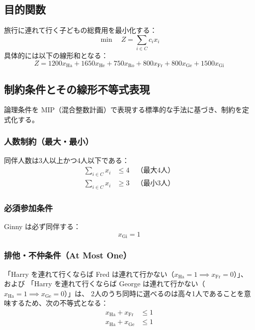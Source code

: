 \documentclass[11pt,a4paper]{ltjsarticle}
\begin{document}
\subsection{目的関数}
旅行に連れて行く子どもの総費用を最小化する：
\begin{equation}
  \min \quad Z = \sum_{i \in C} c_i x_i
\end{equation}
具体的には以下の線形和となる：
\[
  Z = 1200 x_{\text{Ha}} + 1650 x_{\text{He}} + 750 x_{\text{Ro}} + 800 x_{\text{Fr}} + 800 x_{\text{Ge}} + 1500 x_{\text{Gi}}
\]

\subsection{制約条件とその線形不等式表現}

論理条件を MIP（混合整数計画）で表現する標準的な手法に基づき、制約を定式化する。

\subsubsection{人数制約（最大・最小）}
同伴人数は3人以上かつ4人以下である：
\begin{align}
  \sum_{i \in C} x_i &\le 4 \quad \text{（最大4人）} \\
  \sum_{i \in C} x_i &\ge 3 \quad \text{（最小3人）}
\end{align}

\subsubsection{必須参加条件}
Ginny は必ず同伴する：
\begin{equation}
  x_{\text{Gi}} = 1
\end{equation}

\subsubsection{排他・不仲条件（At Most One）}
「Harry を連れて行くならば Fred は連れて行かない（$x_{\text{Ha}} = 1 \implies x_{\text{Fr}} = 0$）」、および
「Harry を連れて行くならば George は連れて行かない（$x_{\text{Ha}} = 1 \implies x_{\text{Ge}} = 0$）」は、
2人のうち同時に選べるのは高々1人であることを意味するため、次の不等式となる：
\begin{align}
  x_{\text{Ha}} + x_{\text{Fr}} &\le 1 \\
  x_{\text{Ha}} + x_{\text{Ge}} &\le 1
\end{align}
\end{document}
